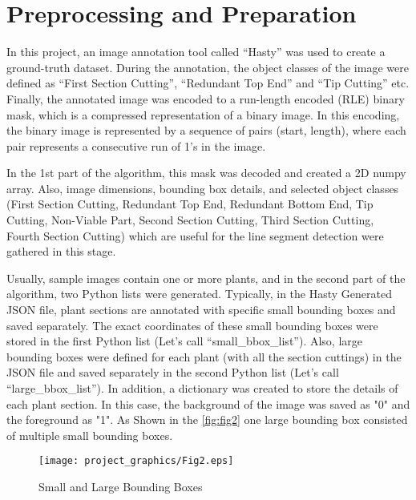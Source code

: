 \documentclass[]{iat}
\begin{document}
\section{Preprocessing and Preparation}
In this project, an image annotation tool called “Hasty” was used to create a ground-truth dataset. During the annotation, the object classes of the image were defined as “First Section Cutting”, “Redundant Top End” and “Tip Cutting” etc. Finally, the annotated image was encoded to a run-length encoded (RLE) binary mask, which is a compressed representation of a binary image. In this encoding, the binary image is represented by a sequence of pairs (start, length), where each pair represents a consecutive run of 1's in the image. 
\par
In the 1st part of the algorithm, this mask was decoded and created a 2D numpy array. Also, image dimensions, bounding box details, and selected object classes (First Section Cutting, Redundant Top End, Redundant Bottom End, Tip Cutting, Non-Viable Part, Second Section Cutting, Third Section Cutting, Fourth Section Cutting) which are useful for the line segment detection were gathered in this stage.
\par
Usually, sample images contain one or more plants, and in the second part of the algorithm, two Python lists were generated. Typically, in the Hasty Generated JSON file, plant sections are annotated with specific small bounding boxes and saved separately. The exact coordinates of these small bounding boxes were stored in the first Python list (Let’s call “small\_bbox\_list”). Also, large bounding boxes were defined for each plant (with all the section cuttings) in the JSON file and saved separately in the second Python list (Let’s call “large\_bbox\_list”). In addition, a dictionary was created to store the details of each plant section. In this case, the background of the image was saved as "0" and the foreground as "1". As Shown in the  \autoref{fig:fig2} one large bounding box consisted of multiple small bounding boxes. 
\par
\FloatBarrier
\begin{figure}[h]
    
	\texttt{[image: project\_graphics/Fig2.eps]}
	\caption{Small and Large Bounding Boxes}
	\label{fig:fig2}
\end{figure}
\end{document}
